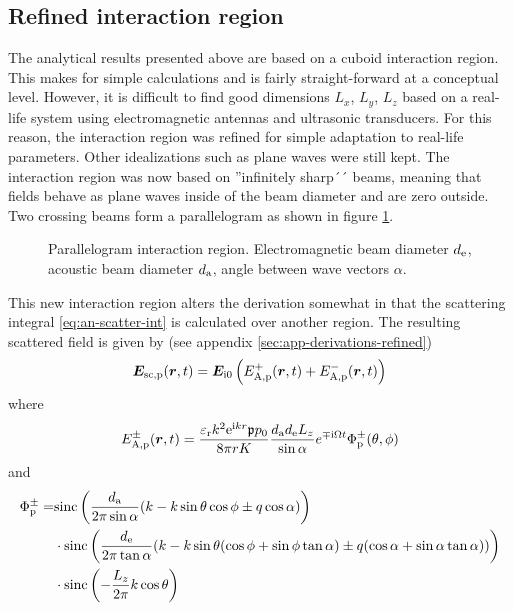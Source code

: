 \documentclass[11pt,twoside]{eitExjobb}
\begin{document}
	\subsection{Refined interaction region}
	The analytical results presented above are based on a cuboid interaction region. This makes for simple calculations and is fairly straight-forward at a conceptual level. However, it is difficult to find good dimensions $L_x$, $L_y$, $L_z$ based on a real-life system using electromagnetic antennas and ultrasonic transducers. For this reason, the interaction region was refined for simple adaptation to real-life parameters. Other idealizations such as plane waves were still kept. The interaction region was now based on ''infinitely sharp´´ beams, meaning that fields behave as plane waves inside of the beam diameter and are zero outside. Two crossing beams form a parallelogram as shown in figure \ref{fig:an-parallelogram}.
	\begin{figure}[h]
		\centering
		\resizebox{\textwidth}{!}{
			
		}
		\caption{\label{fig:an-parallelogram} Parallelogram interaction region. Electromagnetic beam diameter $d_{\mathrm{e}}$, acoustic beam diameter $d_{\mathrm{a}}$, angle between wave vectors $\alpha$.}
	\end{figure}
	This new interaction region alters the derivation somewhat in that the scattering integral \eqref{eq:an-scatter-int} is calculated over another region. The resulting scattered field is given by (see appendix \ref{sec:app-derivations-refined})
	\begin{equation*}
	\bm{E}_{\mathrm{sc,p}} (\bm{r},t) = \bm{E}_{\mathrm{i}0} \left( E_{\mathrm{A,p}}^+ (\bm{r},t) + E_{\mathrm{A,p}}^- (\bm{r},t) \right)
	\end{equation*}
	where
	\begin{equation*}
	E_{\mathrm{A,p}}^\pm (\bm{r},t) = \frac{\varepsilon_{\mathrm{r}}k^2 \mathrm{e}^{\mathrm{i} kr} \mathfrak{p} p_0}{8\pi r K} \frac{d_{\mathrm{a}} d_{\mathrm{e}} L_{z}}{\sin{\alpha}} e^{\mp \mathrm{i} \Omega t} \Phi_{\mathrm{p}}^\pm (\theta,\phi)
	\end{equation*}
	and
	\begin{equation*}
	\begin{split}
	\Phi_{\mathrm{p}}^\pm =& \text{sinc}\left( \frac{d_{\mathrm{a}}}{2\pi \sin{\alpha}}(k - k\sin{\theta}\cos{\phi} \pm q\cos{\alpha}) \right) \\
	&\cdot \text{sinc}\left( \frac{d_{\mathrm{e}}}{2\pi \tan{\alpha}}
	(k - k\sin{\theta}(\cos{\phi} + \sin{\phi}\tan{\alpha}) \pm q(\cos{\alpha} + \sin{\alpha}\tan{\alpha})) \right) \\
	&\cdot \text{sinc}\left( -\frac{L_{z}}{2\pi} k\cos{\theta} \right)
	\end{split}
	\end{equation*}
\end{document}
